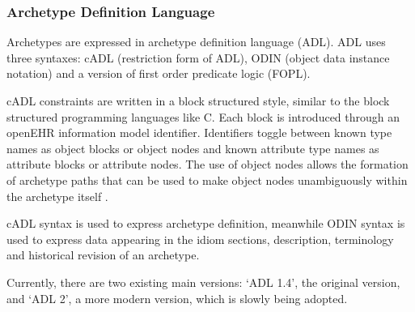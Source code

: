 \subsubsection{Archetype Definition Language}

Archetypes are expressed in archetype definition language \cite{openEHRADL} (ADL). ADL uses three syntaxes: cADL (restriction form of ADL), ODIN (object data instance notation) and a version of first order predicate logic (FOPL).

cADL constraints are written in a block structured style, similar to the block structured programming languages like C. Each block is introduced through an open\-EHR information model identifier. Identifiers toggle between known type names as object blocks or object nodes and known attribute type names as attribute blocks or attribute nodes. The use of object nodes allows the formation of archetype paths that can be used to make object nodes unambiguously within the archetype itself \cite{openEHRADL}.

cADL syntax is used to express archetype definition, meanwhile ODIN syntax is used to express data appearing in the idiom sections, description, terminology and historical revision of an archetype.

Currently, there are two existing main versions: `ADL 1.4', the original version, and `ADL 2', a more modern version, which is slowly being adopted.

